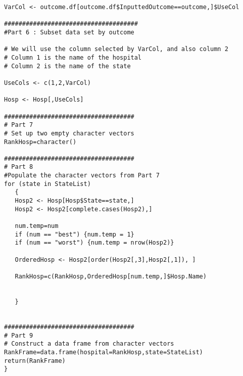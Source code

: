 \documentclass[]{article}
\begin{document}
\begin{framed}
\begin{verbatim}
VarCol <- outcome.df[outcome.df$InputtedOutcome==outcome,]$UseCol

#####################################
#Part 6 : Subset data set by outcome

# We will use the column selected by VarCol, and also column 2
# Column 1 is the name of the hospital
# Column 2 is the name of the state

UseCols <- c(1,2,VarCol)

Hosp <- Hosp[,UseCols]

####################################
# Part 7
# Set up two empty character vectors
RankHosp=character()

####################################
# Part 8
#Populate the character vectors from Part 7
for (state in StateList)
   {
   Hosp2 <- Hosp[Hosp$State==state,]
   Hosp2 <- Hosp2[complete.cases(Hosp2),]
   
   num.temp=num
   if (num == "best") {num.temp = 1}
   if (num == "worst") {num.temp = nrow(Hosp2)}

   OrderedHosp <- Hosp2[order(Hosp2[,3],Hosp2[,1]), ]
        
   RankHosp=c(RankHosp,OrderedHosp[num.temp,]$Hosp.Name)
  
    
   }


####################################
# Part 9
# Construct a data frame from character vectors
RankFrame=data.frame(hospital=RankHosp,state=StateList)
return(RankFrame)
}
\end{verbatim}
\end{framed}
\end{document}
